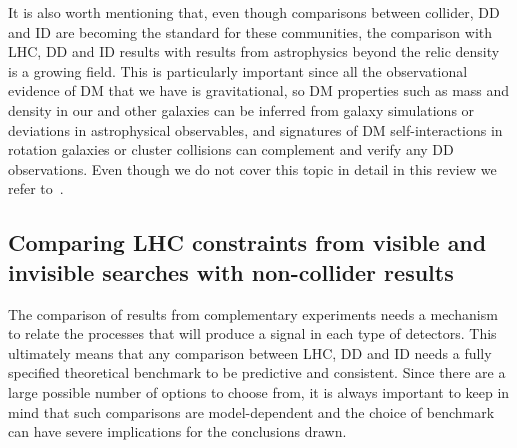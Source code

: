 It is also worth mentioning that, even though comparisons between collider, DD and ID are becoming the standard for these communities,
the comparison with LHC, DD and ID results with results from astrophysics beyond the relic density is a growing field. 
This is particularly important since all the observational evidence of DM that we have is gravitational,
so DM properties such as mass and density in our and other galaxies
can be inferred from galaxy simulations or deviations in astrophysical observables, 
and signatures of DM self-interactions in rotation galaxies or cluster collisions can complement and verify any DD 
observations. Even though we do not cover this topic in detail in this review we refer to~\cite{Buckley:2017ijx}. 

\subsection{Comparing LHC constraints from visible and invisible searches with non-collider results}

The comparison of results from complementary experiments needs a mechanism to relate the processes
that will produce a signal in each type of detectors. This ultimately means that any comparison between LHC, DD and ID
needs a fully specified theoretical benchmark to be predictive and consistent. Since there are a large possible number of options to choose from, it is always important to keep in mind that such comparisons are model-dependent and the choice of benchmark can have severe implications for the conclusions drawn. 


